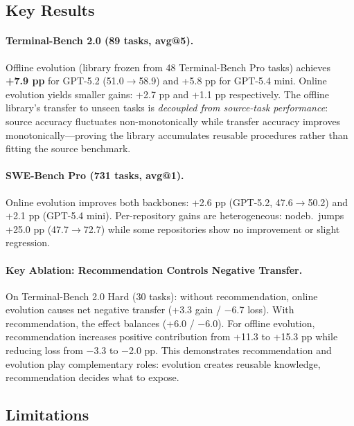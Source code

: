 \documentclass[11pt,a4paper]{article}
\begin{document}
\subsection{Key Results}

\paragraph{Terminal-Bench 2.0 (89 tasks, avg@5).} Offline evolution (library frozen from 48 Terminal-Bench Pro tasks) achieves \textbf{+7.9 pp} for GPT-5.2 (51.0$\rightarrow$58.9) and +5.8 pp for GPT-5.4 mini. Online evolution yields smaller gains: +2.7 pp and +1.1 pp respectively. The offline library's transfer to unseen tasks is \textit{decoupled from source-task performance}: source accuracy fluctuates non-monotonically while transfer accuracy improves monotonically---proving the library accumulates reusable procedures rather than fitting the source benchmark.

\paragraph{SWE-Bench Pro (731 tasks, avg@1).} Online evolution improves both backbones: +2.6 pp (GPT-5.2, 47.6$\rightarrow$50.2) and +2.1 pp (GPT-5.4 mini). Per-repository gains are heterogeneous: nodeb.\ jumps +25.0 pp (47.7$\rightarrow$72.7) while some repositories show no improvement or slight regression.

\paragraph{Key Ablation: Recommendation Controls Negative Transfer.} On Terminal-Bench 2.0 Hard (30 tasks): without recommendation, online evolution causes net negative transfer (+3.3 gain / $-$6.7 loss). With recommendation, the effect balances (+6.0 / $-$6.0). For offline evolution, recommendation increases positive contribution from +11.3 to +15.3 pp while reducing loss from $-$3.3 to $-$2.0 pp. This demonstrates recommendation and evolution play complementary roles: evolution creates reusable knowledge, recommendation decides what to expose.

\subsection{Limitations}
\end{document}
